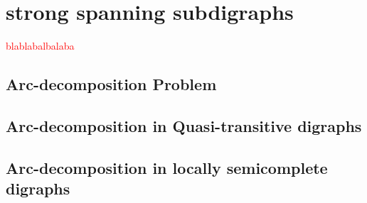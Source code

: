 \chapter{strong spanning subdigraphs}
\textcolor{red}{blablabalbalaba}
\section{Arc-decomposition Problem}
\label{sec:garcdecom}

\clearpage

\section{Arc-decomposition in Quasi-transitive digraphs}
\label{sec:arcquasi}

\clearpage

\section{Arc-decomposition in locally semicomplete digraphs}
\label{sec:arclocally}

\clearpage